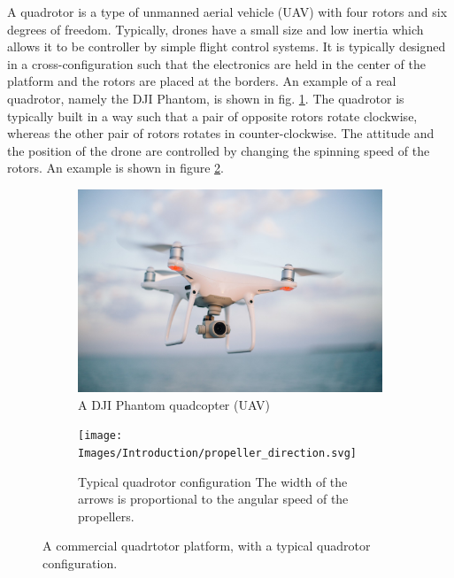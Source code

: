 \documentclass{thesisreport}
\begin{document}
A quadrotor is a type of unmanned aerial vehicle (UAV) with four rotors and six degrees of freedom. Typically, drones have a small size and low inertia which allows it to be controller by simple flight control systems. It is typically designed in a cross-configuration such that the electronics are held in the center of the platform and the rotors are placed at the borders.
An example of a real quadrotor, namely the DJI Phantom, is shown in fig. \ref{fig:drone}. The quadrotor is typically built in a way such that a pair of opposite rotors rotate clockwise, whereas the other pair of rotors rotates in counter-clockwise.
The attitude and the position of the drone are controlled by changing the spinning speed of the rotors. An example is shown in figure \ref{fig:propeller_directions}.



\begin{figure}[h]
     \centering
     \begin{subfigure}[b]{0.45\textwidth}
         \centering
         \includegraphics[width=\textwidth]{Images/Introduction/drone}
         \caption[Caption for LOF]{A DJI Phantom quadcopter (UAV)\protect\footnotemark}
         \label{fig:drone}
     \end{subfigure}
     \hfill
     \begin{subfigure}[b]{0.45\textwidth}
         \centering
         \texttt{[image: Images/Introduction/propeller\_direction.svg]}
         \caption{Typical quadrotor configuration The width of the arrows is proportional to the angular speed of the propellers.\cite{Bouabdalla2007}}
         \label{fig:propeller_directions}
     \end{subfigure}
        \caption{A commercial quadrtotor platform, with a typical quadrotor configuration.}
        \label{fig:three graphs}
\end{figure}
\end{document}

